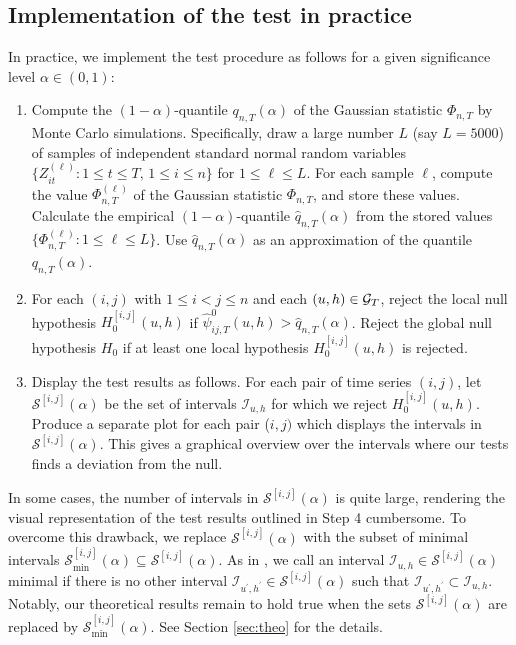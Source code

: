 \documentclass[a4paper,12pt]{article}
\begin{document}
\subsection{Implementation of the test in practice}\label{subsec:test:impl}


In practice, we implement the test procedure as follows for a given significance level $\alpha \in (0, 1)$:
\begin{enumerate}[label=\textit{Step \arabic*.}, leftmargin=1.45cm]
\item Compute the $(1-\alpha)$-quantile $q_{n, T}(\alpha)$ of the Gaussian statistic $\Phi_{n,T}$ by Monte Carlo simulations. Specifically, draw a large number $L$ (say $L=5000$) of samples of independent standard normal random variables $\{Z_{it}^{(\ell)} : 1 \le t \le T, \, 1 \le i \le n \}$ for $1 \le \ell \le L$. For each sample $\ell$, compute the value $\Phi_{n,T}^{(\ell)}$ of the Gaussian statistic $\Phi_{n, T}$, and store these values. Calculate the empirical $(1-\alpha)$-quantile $\widehat{q}_{n, T}(\alpha)$ from the stored values $\{ \Phi_{n, T}^{(\ell)}: 1 \le \ell \le L \}$. Use $\widehat{q}_{n, T}(\alpha)$ as an approximation of the quantile $q_{n, T}(\alpha)$.
\item For each $(i, j)$ with $1 \le i < j \le n$ and each $(u, h) \in \mathcal{G}_T$, reject the local null hypothesis $H_0^{[i, j]}(u, h)$ if $\widehat{\psi}^0_{ij, T}(u, h)> \widehat{q}_{n, T}(\alpha)$. Reject the global null hypothesis $H_0$ if at least one local hypothesis $H_0^{[i, j]}(u, h)$ is rejected. 
\item Display the test results as follows. For each pair of time series $(i,j)$, let $\mathcal{S}^{[i, j]}(\alpha)$ be the set of intervals $\mathcal{I}_{u, h}$ for which we reject $H_0^{[i, j]}(u, h)$. Produce a separate plot for each pair ($i,j)$ which displays the intervals in $\mathcal{S}^{[i, j]}(\alpha)$. This gives a graphical overview over the intervals where our tests finds a deviation from the null. 
\end{enumerate}

\begin{remark} 
In some cases, the number of intervals in $\mathcal{S}^{[i, j]}(\alpha)$ is quite large, rendering the visual representation of the test results outlined in Step 4 cumbersome. To overcome this drawback, we replace $\mathcal{S}^{[i, j]}(\alpha)$ with the subset of minimal intervals $\mathcal{S}^{[i, j]}_{\text{min}}(\alpha) \subseteq \mathcal{S}^{[i, j]}(\alpha)$. As in \cite{Duembgen2002}, we call an interval $\mathcal{I}_{u, h} \in \mathcal{S}^{[i, j]}(\alpha)$ minimal if there is no other interval $\mathcal{I}_{u^\prime, h^\prime} \in \mathcal{S}^{[i, j]}(\alpha)$ such that $\mathcal{I}_{u^\prime, h^\prime} \subset \mathcal{I}_{u, h}$. Notably, our theoretical results remain to hold true when the sets $\mathcal{S}^{[i, j]}(\alpha)$ are replaced by $\mathcal{S}^{[i, j]}_{\text{min}}(\alpha)$. See Section \ref{sec:theo} for the details. 
\end{remark}
\end{document}

